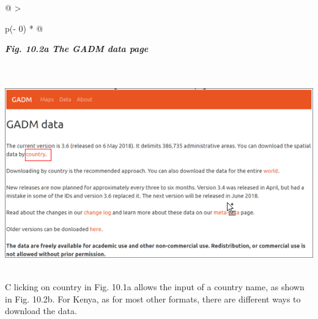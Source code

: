 \documentclass[
  letterpaper,
  DIV=11,
  numbers=noendperiod]{scrreprt}
\begin{document}
\begin{longtable}[]{@{}
  >{\raggedright\arraybackslash}p{(\columnwidth - 0\tabcolsep) * }@{}}
\toprule\noalign{}
\begin{minipage}[b]{\linewidth}\raggedright
\textbf{\emph{Fig. 10.2a The GADM data page}}
\end{minipage} \\
\midrule\noalign{}
\endhead
\bottomrule\noalign{}
\endlastfoot
\includegraphics[width=6.11749in,height=3.30545in]{figures/Fig10.2a.png} \\
\end{longtable}

C licking on country in Fig. 10.1a allows the input of a country name,
as shown in Fig. 10.2b. For Kenya, as for most other formats, there are
different ways to download the data.
\end{document}
